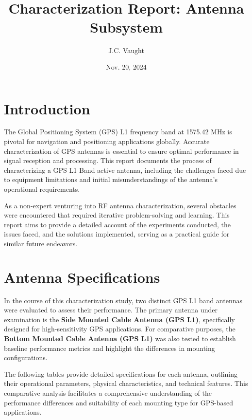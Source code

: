\documentclass[12pt,letter]{article}
\title{Characterization Report: Antenna Subsystem}
\author{J.C. Vaught}
\date{Nov. 20, 2024}
\begin{document}
\maketitle
\vfill
\section*{Introduction}

The Global Positioning System (GPS) L1 frequency band at 1575.42 MHz is pivotal for navigation and positioning applications globally. Accurate characterization of GPS antennas is essential to ensure optimal performance in signal reception and processing. This report documents the process of characterizing a GPS L1 Band active antenna, including the challenges faced due to equipment limitations and initial misunderstandings of the antenna's operational requirements.

As a non-expert venturing into RF antenna characterization, several obstacles were encountered that required iterative problem-solving and learning. This report aims to provide a detailed account of the experiments conducted, the issues faced, and the solutions implemented, serving as a practical guide for similar future endeavors.

\newpage
\section*{Antenna Specifications}

In the course of this characterization study, two distinct GPS L1 band antennas were evaluated to assess their performance. The primary antenna under examination is the \textbf{Side Mounted Cable Antenna (GPS L1)}, specifically designed for high-sensitivity GPS applications. For comparative purposes, the \textbf{Bottom Mounted Cable Antenna (GPS L1)} was also tested to establish baseline performance metrics and highlight the differences in mounting configurations.

The following tables provide detailed specifications for each antenna, outlining their operational parameters, physical characteristics, and technical features. This comparative analysis facilitates a comprehensive understanding of the performance differences and suitability of each mounting type for GPS-based applications.
\end{document}
